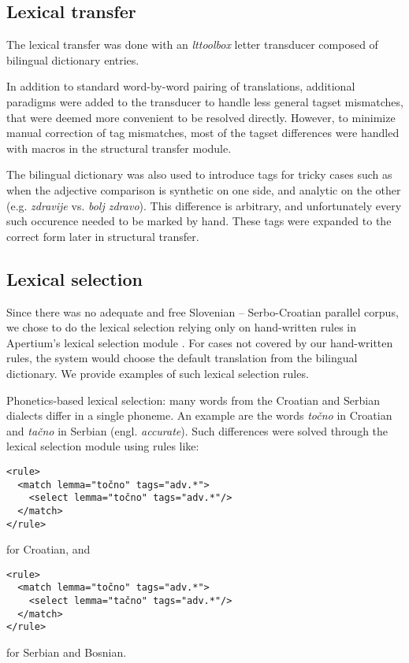 \subsection{Lexical transfer}
The lexical transfer was done with an \emph{lttoolbox} letter
transducer composed of bilingual dictionary entries.

In addition to standard word-by-word pairing of translations,
additional paradigms were added to the transducer to handle
less general tagset mismatches, that were deemed more convenient to
be resolved directly.
However, to minimize manual correction of tag mismatches, most of the
tagset differences were handled with macros in the structural transfer
module.

The bilingual dictionary was also used to introduce tags for
tricky cases such as when the adjective comparison is synthetic on one
side, and analytic on the other (e.g. \emph{zdravije} vs. \emph{bolj zdravo}).
This difference is arbitrary, and unfortunately every such occurence
needed to be marked by hand. These tags were expanded to the correct
form later in structural transfer.

\subsection{Lexical selection}

Since there was no adequate and free Slovenian -- Serbo-Croatian parallel corpus, 
we chose to do the lexical selection relying only on hand-written rules in 
Apertium's lexical selection module \cite{tyers12a}.
For cases not covered by our hand-written rules, the system would choose the 
default translation from the bilingual dictionary.
We provide examples of such lexical selection rules.

Phonetics-based lexical selection: many words from the Croatian and Serbian dialects differ in a single phoneme.
An example are the words \emph{točno} in Croatian and \emph{tačno} in Serbian (engl. \emph{accurate}).
Such differences were solved through the lexical selection module using rules like:

{\small
\begin{Verbatim}
<rule>
  <match lemma="točno" tags="adv.*">
    <select lemma="točno" tags="adv.*"/>
  </match>
</rule>
\end{Verbatim}
}
for Croatian, and
{\small
\begin{Verbatim}
<rule>
  <match lemma="točno" tags="adv.*">
    <select lemma="tačno" tags="adv.*"/>
  </match>
</rule>
\end{Verbatim}
}
for Serbian and Bosnian.

